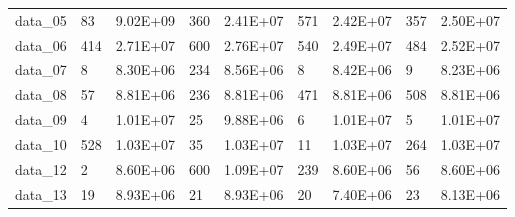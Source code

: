 \begin{table}[!h]
\begin{tabular}{lllllllll}
data\_05 & 83                & 9.02E+09             & 360                                      & 2.41E+07                                     & 571                                         & 2.42E+07                                        & 357                                      & 2.50E+07                                     \\
data\_06 & 414               & 2.71E+07             & 600                                      & 2.76E+07                                     & 540                                         & 2.49E+07                                        & 484                                      & 2.52E+07                                     \\
data\_07 & 8                 & 8.30E+06             & 234                                      & 8.56E+06                                     & 8                                           & 8.42E+06                                        & 9                                        & 8.23E+06                                     \\
data\_08 & 57                & 8.81E+06             & 236                                      & 8.81E+06                                     & 471                                         & 8.81E+06                                        & 508                                      & 8.81E+06                                     \\
data\_09 & 4                 & 1.01E+07             & 25                                       & 9.88E+06                                     & 6                                           & 1.01E+07                                        & 5                                        & 1.01E+07                                     \\
data\_10 & 528               & 1.03E+07             & 35                                       & 1.03E+07                                     & 11                                          & 1.03E+07                                        & 264                                      & 1.03E+07                                     \\
data\_12 & 2                 & 8.60E+06             & 600                                      & 1.09E+07                                     & 239                                         & 8.60E+06                                        & 56                                       & 8.60E+06                                     \\
data\_13 & 19                & 8.93E+06             & 21                                       & 8.93E+06                                     & 20                                          & 7.40E+06                                        & 23                                       & 8.13E+06                                     \\

\end{tabular}
\end{table}
